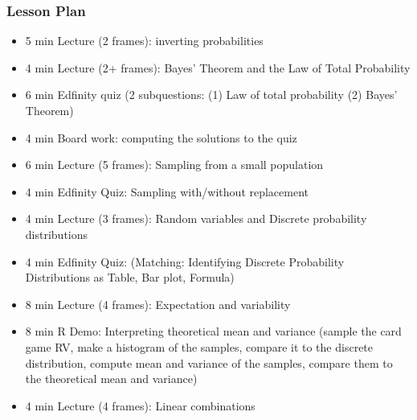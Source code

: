\begin{frame}
    \frametitle{Lesson Plan}
    \begin{itemize}
        \item 5 min Lecture (2 frames): inverting probabilities
        \item 4 min Lecture (2+ frames): Bayes' Theorem and the Law of Total Probability
        \item 6 min Edfinity quiz (2 subquestions: (1) Law of total probability (2) Bayes' Theorem)
        \item 4 min Board work: computing the solutions to the quiz

        \item 6 min Lecture (5 frames): Sampling from a small population
        \item 4 min Edfinity Quiz: Sampling with/without replacement
        \item 4 min Lecture (3 frames): Random variables and Discrete probability distributions
        \item 4 min Edfinity Quiz: (Matching: Identifying Discrete Probability Distributions as Table, Bar plot, Formula)
        
        \item 8 min Lecture (4 frames): Expectation and variability
        \item 8 min R Demo: Interpreting theoretical mean and variance (sample the card game RV, make a histogram of the samples, compare it to the discrete distribution, compute mean and variance of the samples, compare them to the theoretical mean and variance)
        \item 4 min Lecture (4 frames): Linear combinations
   \end{itemize}
\end{frame}


